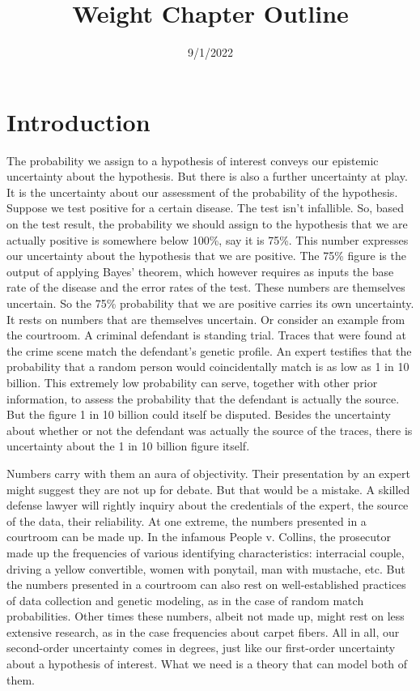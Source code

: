 \documentclass[
  10pt,
  dvipsnames,enabledeprecatedfontcommands]{scrartcl}
\title{Weight Chapter Outline}
\author{}
\date{\vspace{-2.5em}9/1/2022}
\begin{document}
\maketitle

\hypertarget{introduction}{%
\section{Introduction}\label{introduction}}

The probability we assign to a hypothesis of interest conveys our
epistemic uncertainty about the hypothesis. But there is also a further
uncertainty at play. It is the uncertainty about our assessment of the
probability of the hypothesis. Suppose we test positive for a certain
disease. The test isn't infallible. So, based on the test result, the
probability we should assign to the hypothesis that we are actually
positive is somewhere below 100\%, say it is 75\%. This number expresses
our uncertainty about the hypothesis that we are positive. The 75\%
figure is the output of applying Bayes' theorem, which however requires
as inputs the base rate of the disease and the error rates of the test.
These numbers are themselves uncertain. So the 75\% probability that we
are positive carries its own uncertainty. It rests on numbers that are
themselves uncertain. Or consider an example from the courtroom. A
criminal defendant is standing trial. Traces that were found at the
crime scene match the defendant's genetic profile. An expert testifies
that the probability that a random person would coincidentally match is
as low as 1 in 10 billion. This extremely low probability can serve,
together with other prior information, to assess the probability that
the defendant is actually the source. But the figure 1 in 10 billion
could itself be disputed. Besides the uncertainty about whether or not
the defendant was actually the source of the traces, there is
uncertainty about the 1 in 10 billion figure itself.

Numbers carry with them an aura of objectivity. Their presentation by an
expert might suggest they are not up for debate. But that would be a
mistake. A skilled defense lawyer will rightly inquiry about the
credentials of the expert, the source of the data, their reliability. At
one extreme, the numbers presented in a courtroom can be made up. In the
infamous People v. Collins, the prosecutor made up the frequencies of
various identifying characteristics: interracial couple, driving a
yellow convertible, women with ponytail, man with mustache, etc. But the
numbers presented in a courtroom can also rest on well-established
practices of data collection and genetic modeling, as in the case of
random match probabilities. Other times these numbers, albeit not made
up, might rest on less extensive research, as in the case frequencies
about carpet fibers. All in all, our second-order uncertainty comes in
degrees, just like our first-order uncertainty about a hypothesis of
interest. What we need is a theory that can model both of them.
\end{document}
